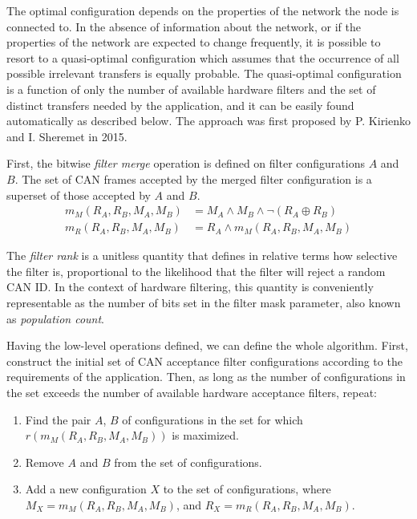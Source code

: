 \begin{remark}[breakable]
    The optimal configuration depends on the properties of the network the node is connected to.
    In the absence of information about the network,
    or if the properties of the network are expected to change frequently,
    it is possible to resort to a quasi-optimal configuration which assumes that
    the occurrence of all possible irrelevant transfers is equally probable.
    The quasi-optimal configuration is a function of only the number of available hardware filters
    and the set of distinct transfers needed by the application, and it can be easily found automatically
    as described below.
    The approach was first proposed by P. Kirienko and I. Sheremet in 2015.

    First, the bitwise \emph{filter merge} operation is defined on filter configurations $A$ and $B$.
    The set of CAN frames accepted by the merged filter configuration is a superset of those accepted by $A$ and $B$.
    \begin{equation*}
    \begin{split}
        m_M(R_A, R_B, M_A, M_B) & = M_A \land M_B \land \neg (R_A \oplus R_B) \\
        m_R(R_A, R_B, M_A, M_B) & = R_A \land m_M(R_A, R_B, M_A, M_B)
    \end{split}
    \end{equation*}

    The \emph{filter rank} is a unitless quantity that defines in relative terms how selective the filter is,
    proportional to the likelihood that the filter will reject a random CAN ID.
    In the context of hardware filtering, this quantity is conveniently representable as the number of bits set in
    the filter mask parameter, also known as \emph{population count}.

    Having the low-level operations defined, we can define the whole algorithm.
    First, construct the initial set of CAN acceptance filter configurations
    according to the requirements of the application.
    Then, as long as the number of configurations in the set exceeds the number of available
    hardware acceptance filters, repeat:
    \begin{enumerate}
        \item Find the pair $A$, $B$ of configurations in the set for which $r(m_M(R_A, R_B, M_A, M_B))$ is maximized.
        \item Remove $A$ and $B$ from the set of configurations.
        \item Add a new configuration $X$ to the set of configurations, where
        $M_X = m_M(R_A, R_B, M_A, M_B)$, and $R_X = m_R(R_A, R_B, M_A, M_B)$.
    \end{enumerate}
\end{remark}
